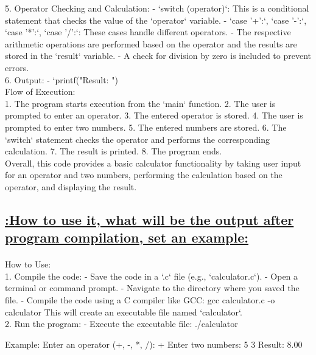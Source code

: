 \documentclass[a4paper,12pt]{article}
\begin{document}
5. Operator Checking and Calculation:
   - `switch (operator)`: This is a conditional statement that checks the value of the `operator` variable.
   - `case '+':`, `case '-':`, `case '*':`, `case '/':`: These cases handle different operators.
   - The respective arithmetic operations are performed based on the operator and the results are stored in the `result` variable.
   - A check for division by zero is included to prevent errors.\\

6. Output:
   - `printf("Result: ")\\

Flow of Execution:\\

1. The program starts execution from the `main` function.
2. The user is prompted to enter an operator.
3. The entered operator is stored.
4. The user is prompted to enter two numbers.
5. The entered numbers are stored.
6. The `switch` statement checks the operator and performs the corresponding calculation.
7. The result is printed.
8. The program ends.\\
Overall, this code provides a basic calculator functionality by taking user input for an operator and two numbers, performing the calculation based on the operator, and displaying the result.

\begin{center}
\section*{\uline{:How to use it, what will be the output after program compilation, set an example:}}
\end{center}

\paragraph{}
How to Use:\\

1. Compile the code:
   - Save the code in a `.c` file (e.g., `calculator.c`).
   - Open a terminal or command prompt.
   - Navigate to the directory where you saved the file.
   - Compile the code using a C compiler like GCC:
     gcc calculator.c -o calculator
     This will create an executable file named `calculator`.\\

2. Run the program:
   - Execute the executable file:
     ./calculator

Example:
Enter an operator (+, -, *, /): +
Enter two numbers: 5 3
Result: 8.00\\
\end{document}
